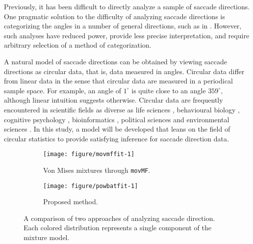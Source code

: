 Previously, it has been difficult to directly analyze a sample of saccade directions. One pragmatic solution to the difficulty of analyzing saccade directions is categorizing the angles in a number of general directions, such as in \citet{foulsham2008turning}. However, such analyses have reduced power, provide less precise interpretation, and require arbitrary selection of a method of categorization.

A natural model of saccade directions can be obtained by viewing saccade directions as circular data, that is, data measured in angles. Circular data differ from linear data in the sense that circular data are measured in a periodical sample space. For example, an angle of $1^{\circ}$ is quite close to an angle $359^{\circ},$ although linear intuition suggests otherwise. Circular data are frequently encountered in scientific fields as diverse as life sciences \citep{mardianew}, behavioural biology \citep{bulbert2015danger}, cognitive psychology \citep{kaas2006haptic}, bioinformatics \citep{mardia2008multivariate}, political sciences \citep{gill2010} and environmental sciences \citep{arnold2006recent}. In this study, a model will be developed that leans on the field of circular statistics \citep{fisher1995statistical, mardia2009directional, pewsey2013circular} to provide satisfying inference for saccade direction data.

\begin{figure}
  \begin{subfigure}[t]{0.5\linewidth}
    \centering
\begin{knitrout}
\color{fgcolor}
\texttt{[image: figure/movmffit-1]} 

\end{knitrout}
    \caption{Von Mises mixtures through \texttt{movMF}.}\label{scd_fit:movmf}
  \end{subfigure}%
  \begin{subfigure}[t]{0.5\linewidth}
   \centering
\begin{knitrout}
\color{fgcolor}
\texttt{[image: figure/powbatfit-1]} 

\end{knitrout}
    \caption{Proposed method.}\label{scd_fit:flexcircmix}
  \end{subfigure}
  \label{scd_fit}
  \caption{A comparison of two approaches of analyzing saccade direction. Each colored distribution represents a single component of the mixture model. }
\end{figure}

